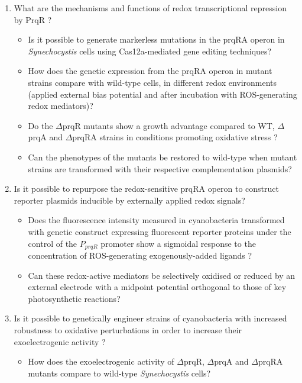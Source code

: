 \begin{enumerate}
    \item What are the mechanisms and functions of redox transcriptional repression by PrqR ?
    \begin{itemize}
        \item Is it possible to generate markerless mutations in the prqRA operon in \textit{Synechocystis} cells using Cas12a-mediated gene editing techniques?
        \item How does the genetic expression from the prqRA operon in mutant strains compare with wild-type cells, in different redox environments (applied external bias potential and after incubation with ROS-generating redox mediators)?
        \item Do the $\Delta$prqR mutants show a growth advantage compared to WT, $\Delta$prqA and $\Delta$prqRA strains in conditions promoting oxidative stress ? 
        \item Can the phenotypes of the mutants be restored to wild-type when mutant strains are transformed with their respective complementation plasmids?
    \end{itemize}
    \item Is it possible to repurpose the redox-sensitive prqRA operon to construct reporter plasmids inducible by externally applied redox signals?
        \begin{itemize}
            \item Does the fluorescence intensity measured in cyanobacteria transformed with genetic construct expressing fluorescent reporter proteins under the control of the $P_{prqR}$ promoter show a sigmoidal response to the concentration of ROS-generating exogenously-added ligands ?
            \item Can these redox-active mediators be selectively oxidised or reduced by an external electrode with a midpoint potential orthogonal to those of key photosynthetic reactions?
        \end{itemize}
    \item Is it possible to genetically engineer strains of cyanobacteria with increased robustness to oxidative perturbations in order to increase their exoelectrogenic activity ?
      \begin{itemize}
            \item How does the exoelectrogenic activity of $\Delta$prqR, $\Delta$prqA and $\Delta$prqRA mutants compare to wild-type \textit{Synechocystis} cells?
    \end{itemize}    
\end{enumerate}


